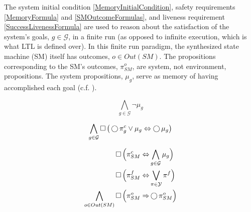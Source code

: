The system initial condition \eqref{MemoryInitialCondition}, safety requirements \eqref{MemoryFormula} and \eqref{SMOutcomeFormulas}, and liveness requirement \eqref{SuccessLivenessFormula} are used to reason about the satisfaction of the system's goals, $g \in \mathcal{G}$, in a finite run (as opposed to infinite execution, which is what LTL is defined over).
In this finite run paradigm, the synthesized state machine (SM) itself has outcomes, $o \in Out(SM)$.
The propositions corresponding to the SM's outcomes, $\pi_{SM}^o$, are system, not environment, propositions.
The system propositions, $\mu_g$, serve as memory of having accomplished each goal (c.f. \cite{Vasu2012IROS}).

\begin{equation}\label{MemoryInitialCondition}
	\bigwedge \limits_{g \in \mathcal{G}} \lnot \mu_g 
\end{equation}


\begin{equation}\label{MemoryFormula}
	\bigwedge \limits_{g \in \mathcal{G}} \operatorname{\Box} \big( \operatorname{\bigcirc} \pi_g^c \vee \mu_g \Leftrightarrow \operatorname{\bigcirc} \mu_g \big)
\end{equation}

\begin{subequations}
	\label{SMOutcomeFormulas}
	\begin{align}
		\operatorname{\Box} \Big( \pi_{SM}^{c} \Leftrightarrow &\bigwedge \limits_{g \in \mathcal{G}} \mu_g \Big) \label{SuccessfulOutcomeFormula}\\
		\operatorname{\Box} \Big( \pi_{SM}^{f} \Leftrightarrow &\bigvee \limits_{\pi \in \mathcal{Y}} \pi^f \Big) \label{FailedOutcomeFormula}\\
		\bigwedge \limits_{o \in Out(SM)} \operatorname{\Box} \Big( \pi_{SM}^{o} \Rightarrow &\operatorname{\bigcirc} \pi_{SM}^{o} \Big) \label{SMOutcomePersistenceFormula}
	\end{align}
\end{subequations}


